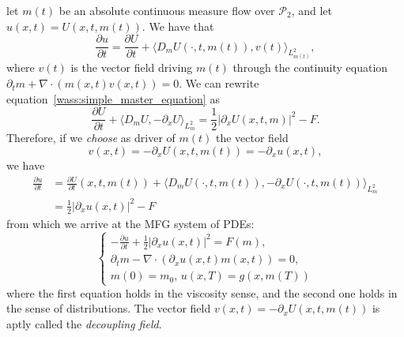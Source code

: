   let $m(t)$ be an absolute continuous measure flow over $\mathcal{P}_2$, and
  let $u(x,t) = U(x,t,m(t))$. We have that
\begin{equation}
    \frac{\partial u}{\partial t} = \frac{\partial U}{\partial t} + \langle D_m U (\cdot, t, m(t)), v(t) \rangle_{L^2_{m(t)}},
\end{equation}
    where $v(t)$ is the vector field driving $m(t)$ through the continuity equation $\partial_t m + \nabla \cdot( m(x,t) v(x,t) ) = 0$.
    We can rewrite equation~\eqref{wass:simple_master_equation} as 
\begin{equation}
    \frac{\partial U}{ \partial t} + \langle D_m U, - \partial_x U \rangle_{L^2_m} = \frac{1}{2} |\partial_x U(x,t,m)|^2 - F.
\end{equation}
    Therefore, if we \textit{choose} as driver of $m(t)$ the vector field 
\begin{equation*}
    v(x,t) = - \partial_x U(x,t,m(t)) = - \partial_x u(x,t),
\end{equation*}
    we have
\begin{align*}
    \frac{\partial u}{\partial t} &=  \frac{\partial U}{ \partial t}(x,t,m(t)) + \langle D_m U(\cdot, t, m(t) ), - \partial_x U(\cdot, t, m(t) ) \rangle_{L^2_m}\\
    &= \frac{1}{2} |\partial_x u(x,t)|^2 - F
\end{align*}
    from which we arrive at the MFG system of PDEs:
\begin{equation}
    \begin{cases}
        - \frac{\partial u}{\partial t} + \frac{1}{2} |\partial_x u(x,t)|^2  = F(m), \\
        \partial_t m - \nabla \cdot( \partial_x u(x,t) m(x,t) ) = 0,\\
        m(0) = m_0, \, u(x,T) = g(x, m(T))
    \end{cases}
\end{equation}
    where the first equation holds in the viscosity sense, and the second
    one holds in the sense of distributions.
    The vector field $v(x,t) = -\partial_x U(x,t,m(t))$ is aptly called the \textit{decoupling field}.